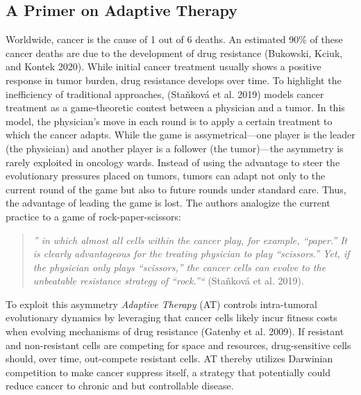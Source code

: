 \documentclass[
]{article}
\begin{document}
\subsection{A Primer on Adaptive
Therapy}\label{a-primer-on-adaptive-therapy}

Worldwide, cancer is the cause of 1 out of 6 deaths. An estimated 90\%
of these cancer deaths are due to the development of drug resistance
(Bukowski, Kciuk, and Kontek 2020). While initial cancer treatment
usually shows a positive response in tumor burden, drug resistance
develops over time. To highlight the inefficiency of traditional
approaches, (Staňková et al. 2019) models cancer treatment as a
game-theoretic contest between a physician and a tumor. In this model,
the physician's move in each round is to apply a certain treatment to
which the cancer adapts. While the game is assymetrical---one player is
the leader (the physician) and another player is a follower (the
tumor)---the asymmetry is rarely exploited in oncology wards. Instead of
using the advantage to steer the evolutionary pressures placed on
tumors, tumors can adapt not only to the current round of the game but
also to future rounds under standard care. Thus, the advantage of
leading the game is lost. The authors analogize the current practice to
a game of rock-paper-scissors:

\begin{quote}
\emph{'' in which almost all cells within the cancer play, for example,
``paper.'' It is clearly advantageous for the treating physician to play
``scissors.'' Yet, if the physician only plays ``scissors,'' the cancer
cells can evolve to the unbeatable resistance strategy of ``rock.''``}
(Staňková et al. 2019).
\end{quote}

To exploit this asymmetry \emph{Adaptive Therapy} (AT) controls
intra-tumoral evolutionary dynamics by leveraging that cancer cells
likely incur fitness costs when evolving mechanisms of drug resistance
(Gatenby et al. 2009). If resistant and non-resistant cells are
competing for space and resources, drug-sensitive cells should, over
time, out-compete resistant cells. AT thereby utilizes Darwinian
competition to make cancer suppress itself, a strategy that potentially
could reduce cancer to chronic and but controllable disease.
\end{document}
